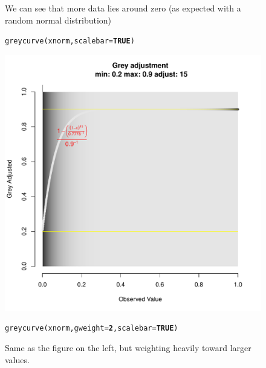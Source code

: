 \documentclass[letterpaper]{article}\usepackage[]{graphicx}\usepackage[]{color}
\makeatletter
\newcommand{\hlnum}[1]{\textcolor[rgb]{0.502,0,0.502}{\textbf{#1}}}%
\newcommand{\hlstd}[1]{\textcolor[rgb]{0,0,0}{#1}}%
\newcommand{\hlkwc}[1]{\textcolor[rgb]{0,0.502,0.753}{#1}}%
\newcommand{\hlkwd}[1]{\textcolor[rgb]{0,0.267,0.4}{#1}}%
\newenvironment{kframe}{%
 \def\at@end@of@kframe{}%
 \ifinner\ifhmode%
  \def\at@end@of@kframe{\end{minipage}}%
  \begin{minipage}{\columnwidth}%
 \fi\fi%
 \def\FrameCommand##1{\hskip\@totalleftmargin \hskip-\fboxsep
 \colorbox{shadecolor}{##1}\hskip-\fboxsep
     \hskip-\linewidth \hskip-\@totalleftmargin \hskip\columnwidth}%
 \MakeFramed {\advance\hsize-\width
   \@totalleftmargin\z@ \linewidth\hsize
   \@setminipage}}%
 {\par\unskip\endMakeFramed%
 \at@end@of@kframe}
\newenvironment{knitrout}{}{} %
\makeatother
\begin{document}
\begin{figure}[h!]
\begin{minipage}[b]{0.45\linewidth}
\centering
\caption{\footnotesize We can see that more data lies around zero (as expected with a random normal distribution)}
\begin{knitrout}\footnotesize
{}\color{fgcolor}\begin{kframe}
\begin{alltt}
\hlkwd{greycurve}\hlstd{(xnorm,} \hlkwc{scalebar} \hlstd{=} \hlnum{TRUE}\hlstd{)}
\end{alltt}
\end{kframe}

{\centering \includegraphics[width=\linewidth]{figure/greycurve_small_heavy} 

}



\end{knitrout}

\end{minipage}
\hspace{0.5cm}
\begin{minipage}[b]{0.45\linewidth}
\centering
\caption{\footnotesize Same as the figure on the left, but weighting heavily toward larger values.}
\begin{knitrout}\footnotesize
{}\color{fgcolor}\begin{kframe}
\begin{alltt}
\hlkwd{greycurve}\hlstd{(xnorm,} \hlkwc{gweight} \hlstd{=} \hlnum{2}\hlstd{,} \hlkwc{scalebar} \hlstd{=} \hlnum{TRUE}\hlstd{)}
\end{alltt}
\end{kframe}


\end{knitrout}
\end{minipage}
\end{figure}
\end{document}
